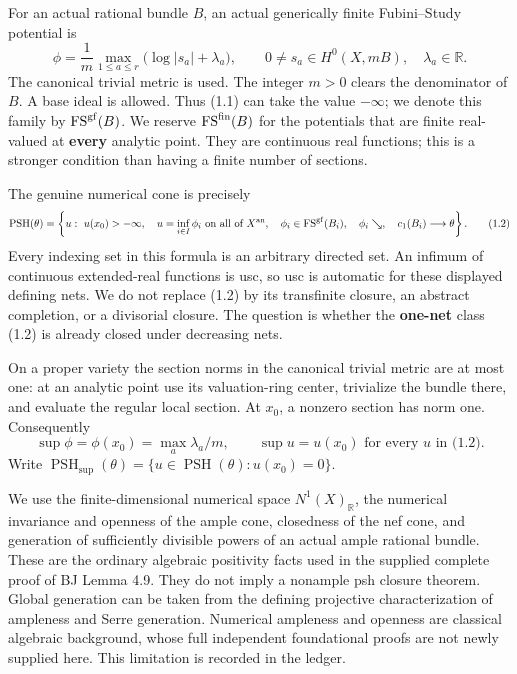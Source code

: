 \documentclass[10pt]{article}
\begin{document}
For an actual rational bundle \(B\), an actual generically finite
Fubini--Study potential is \[
 \phi=\frac1m\max_{1\leq a\leq r}\bigl(\log|s_a|+\lambda_a\bigr),
 \qquad 0\ne s_a\in H^0(X,mB),\quad \lambda_a\in\mathbb R.
 \tag{1.1}
\] The canonical trivial metric is used. The integer \(m>0\) clears the
denominator of \(B\). A base ideal is allowed. Thus (1.1) can take the
value \(-\infty\); we denote this family by
\(\operatorname{FS}^{\rm gf}(B)\). We reserve
\(\operatorname{FS}^{\rm fin}(B)\) for the potentials that are finite
real-valued at \textbf{every} analytic point. They are continuous real
functions; this is a stronger condition than having a finite number of
sections.

The genuine numerical cone is precisely \[
 \operatorname{PSH}(\theta)=
 \left\{u:\ u(x_0)>-\infty,\quad
 u=\inf_{i\in I}\phi_i\text{ on all of }X^{\rm an},\quad
 \phi_i\in\operatorname{FS}^{\rm gf}(B_i),\quad
 \phi_i\searrow,\quad c_1(B_i)\longrightarrow\theta\right\}.
 \tag{1.2}
\] Every indexing set in this formula is an arbitrary directed set. An
infimum of continuous extended-real functions is usc, so usc is
automatic for these displayed defining nets. We do not replace (1.2) by
its transfinite closure, an abstract completion, or a divisorial
closure. The question is whether the \textbf{one-net} class (1.2) is
already closed under decreasing nets.

On a proper variety the section norms in the canonical trivial metric
are at most one: at an analytic point use its valuation-ring center,
trivialize the bundle there, and evaluate the regular local section. At
\(x_0\), a nonzero section has norm one. Consequently \[
 \sup\phi=\phi(x_0)=\max_a\lambda_a/m,
 \qquad \sup u=u(x_0)\text{ for every }u\text{ in (1.2)}.
 \tag{1.3}
\] Write
\(\operatorname{PSH}_{\sup}(\theta)=\{u\in\operatorname{PSH}(\theta):u(x_0)=0\}\).

We use the finite-dimensional numerical space \(N^1(X)_{\mathbb R}\),
the numerical invariance and openness of the ample cone, closedness of
the nef cone, and generation of sufficiently divisible powers of an
actual ample rational bundle. These are the ordinary algebraic
positivity facts used in the supplied complete proof of BJ Lemma 4.9.
They do not imply a nonample psh closure theorem. Global generation can
be taken from the defining projective characterization of ampleness and
Serre generation. Numerical ampleness and openness are classical
algebraic background, whose full independent foundational proofs are not
newly supplied here. This limitation is recorded in the ledger.
\end{document}
